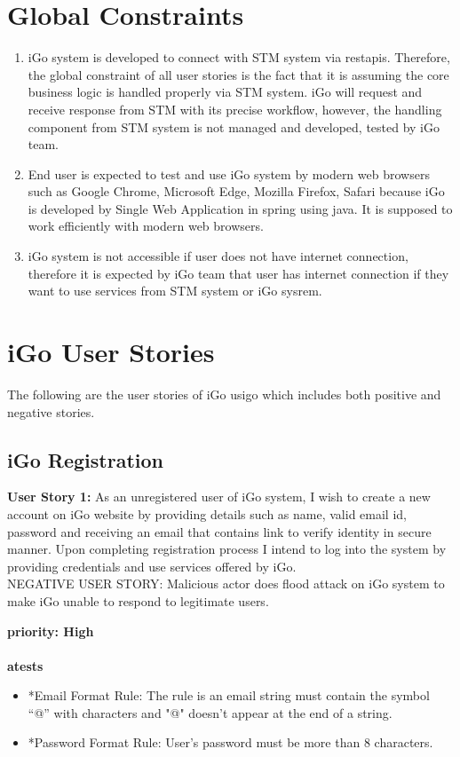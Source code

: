 \documentclass[11pt, english]{report}
\begin{document}
\section{Global Constraints}
\begin{enumerate}
    \item iGo system is developed to connect with STM system via \gls{restapi}s. Therefore, the global constraint of all user stories is the fact that it is assuming the core business logic is handled properly via STM system. iGo will request and receive response from STM with its precise workflow, however, the handling component from STM system is not managed and developed, tested by iGo team.
    \item End user is expected to test and use iGo system by modern web browsers such as Google Chrome, Microsoft Edge, Mozilla Firefox, Safari because iGo is developed by Single Web Application in \gls{spring} using \gls{java}. It is supposed to work efficiently with modern web browsers.
    \item iGo system is not accessible if user does not have internet connection, therefore it is expected by iGo team that user has internet connection if they want to use services from STM system or iGo sysrem.
\end{enumerate}

\section{iGo User Stories}
The following are the user stories\cite{userstory} of iGo \gls{usigo} which includes both positive and negative stories. 
\subsection{iGo Registration}
\textbf{User Story 1: }
As an unregistered user of iGo system, I wish to create a new account on iGo website by providing details such as name, valid email id, password and receiving an email that contains link to verify identity in secure manner. Upon completing registration process I intend to log into the system by providing credentials and use services offered by iGo.
\\
NEGATIVE USER STORY:
Malicious actor does flood attack on iGo system to make iGo unable to respond to legitimate users.

\textbf{\gls{priority}: High}\\ \\
\textbf{\gls{atests}}
\begin{itemize}
    \item *Email Format Rule: The rule is an email string must contain the symbol “@” with characters and "@" doesn't appear at the end of a string.
    \item *Password Format Rule: User’s password must be more than 8 characters.
\end{itemize}
\end{document}
